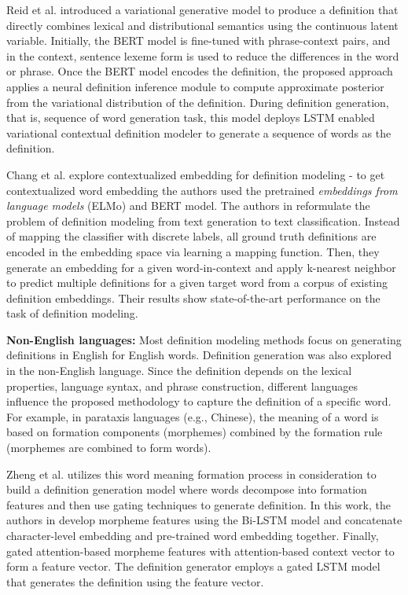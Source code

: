 Reid et al. \cite{reid_vcdm_2020} introduced a variational generative model to
produce a definition that directly combines lexical and distributional semantics
using the continuous latent variable. Initially, the BERT model is fine-tuned
with phrase-context pairs, and in the context, sentence lexeme form is used to
reduce the differences in the word or phrase. Once the BERT model encodes the
definition, the proposed approach applies a neural definition inference module
to compute approximate posterior from the variational distribution of the
definition. During definition generation, that is, sequence of word generation
task, this model deploys LSTM enabled variational contextual definition modeler
to generate a sequence of words as the definition.

Chang et al. \cite{chang_what_2019} explore contextualized embedding for
definition modeling - to get contextualized word embedding the authors used the
pretrained \textit{embeddings from language models} (ELMo) and BERT model. The authors in \cite{chang_what_2019} reformulate the problem of
definition modeling from text generation to text classification. Instead of
mapping the classifier with discrete labels, all ground truth
definitions are encoded in the embedding space via learning a mapping function. Then, they generate an embedding for a given
word-in-context and apply k-nearest neighbor to predict multiple
definitions for a given target word from a corpus of existing definition
embeddings. Their results show state-of-the-art performance on the task of
definition modeling.

\noindent\textbf{Non-English languages:}
Most definition modeling methods focus on generating definitions in English for English words. Definition generation was also explored in the non-English language. Since the definition depends on the lexical properties, language
syntax, and phrase construction, different languages influence the proposed methodology to capture the definition of a specific word. For example, in parataxis languages (e.g., Chinese), the meaning of a word is based on formation components (morphemes) combined by the formation rule (morphemes are combined to form words).

Zheng et al. \cite{zheng_decompose_2021} utilizes this word meaning formation
process in consideration to build a definition generation model where words
decompose into formation features and then use gating techniques to generate
definition. In this work, the authors in \cite{zheng_decompose_2021} develop morpheme features using the Bi-LSTM model and concatenate character-level embedding and pre-trained word embedding together. Finally, gated attention-based morpheme features with
attention-based context vector to form a feature vector. The definition generator employs a gated LSTM model that generates the definition using the feature vector.

